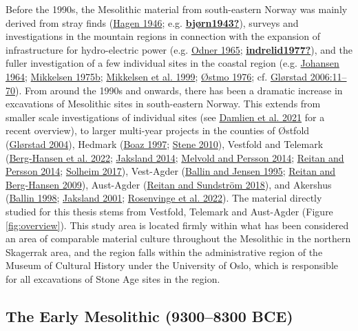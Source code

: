 \documentclass[
  12pt,
  a4paper,
  oneside]{book}
\begin{document}
Before the 1990s, the Mesolithic material from south-eastern Norway was mainly derived from stray finds (\protect\hyperlink{ref-hagen1946}{Hagen 1946}; e.g. \protect\hyperlink{ref-bjuxf8rn1943}{\textbf{bjørn1943?}}), surveys and investigations in the mountain regions in connection with the expansion of infrastructure for hydro-electric power (e.g. \protect\hyperlink{ref-odner1965}{Odner 1965}; \protect\hyperlink{ref-indrelid1977}{\textbf{indrelid1977?}}), and the fuller investigation of a few individual sites in the coastal region (e.g. \protect\hyperlink{ref-johansen1964}{Johansen 1964}; \protect\hyperlink{ref-mikkelsen1975a}{Mikkelsen 1975b}; \protect\hyperlink{ref-mikkelsen1999}{Mikkelsen et al. 1999}; \protect\hyperlink{ref-uxf8stmo1976}{Østmo 1976}; cf. \protect\hyperlink{ref-glorstad2006}{Glørstad 2006:11--70}). From around the 1990s and onwards, there has been a dramatic increase in excavations of Mesolithic sites in south-eastern Norway. This extends from smaller scale investigations of individual sites (see \protect\hyperlink{ref-damlien2021}{Damlien et al. 2021} for a recent overview), to larger multi-year projects in the counties of Østfold (\protect\hyperlink{ref-gluxf8rstad2004}{Glørstad 2004}), Hedmark (\protect\hyperlink{ref-boaz1997}{Boaz 1997}; \protect\hyperlink{ref-stene2010}{Stene 2010}), Vestfold and Telemark (\protect\hyperlink{ref-berg-hansen2022}{Berg-Hansen et al. 2022}; \protect\hyperlink{ref-jaksland2014}{Jaksland 2014}; \protect\hyperlink{ref-melvold2014b}{Melvold and Persson 2014}; \protect\hyperlink{ref-reitan2014l}{Reitan and Persson 2014}; \protect\hyperlink{ref-solheim2017b}{Solheim 2017}), Vest-Agder (\protect\hyperlink{ref-ballin1995}{Ballin and Jensen 1995}; \protect\hyperlink{ref-reitan2009}{Reitan and Berg-Hansen 2009}), Aust-Agder (\protect\hyperlink{ref-reitan2018c}{Reitan and Sundström 2018}), and Akershus (\protect\hyperlink{ref-ballin1998}{Ballin 1998}; \protect\hyperlink{ref-jaksland2001}{Jaksland 2001}; \protect\hyperlink{ref-rosenvinge2022}{Rosenvinge et al. 2022}). The material directly studied for this thesis stems from Vestfold, Telemark and Aust-Agder (Figure \ref{fig:overview}). This study area is located firmly within what has been considered an area of comparable material culture throughout the Mesolithic in the northern Skagerrak area, and the region falls within the administrative region of the Museum of Cultural History under the University of Oslo, which is responsible for all excavations of Stone Age sites in the region.

\hypertarget{the-early-mesolithic-93008300-bce}{%
\subsection{The Early Mesolithic (9300--8300 BCE)}\label{the-early-mesolithic-93008300-bce}}
\end{document}
